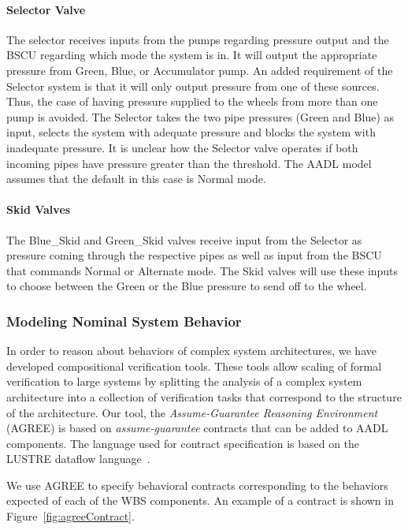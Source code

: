 \paragraph{Selector Valve}
The selector receives inputs from the pumps regarding pressure output and the BSCU regarding which mode the system is in. It will output the appropriate pressure from Green, Blue, or Accumulator pump. An added requirement of the Selector system is that it will only output pressure from one of these sources. Thus, the case of having pressure supplied to the wheels from more than one pump is avoided. The Selector takes the two pipe pressures (Green and Blue) as input, selects the system with adequate pressure and blocks the system with inadequate pressure. It is unclear how the Selector valve operates if both incoming pipes have pressure greater than the threshold. The AADL model assumes that the default in this case is Normal mode.

\paragraph{Skid Valves}
The Blue\_Skid and Green\_Skid valves receive input from the Selector as pressure coming through the respective pipes as well as input from the BSCU that commands Normal or Alternate mode. The Skid valves will use these inputs to choose between the Green or the Blue pressure to send off to the wheel.

\subsubsection{Modeling Nominal System Behavior}
In order to reason about behaviors of complex system architectures, we have developed compositional verification tools.  These tools \cite{NFM2012:CoGaMiWhLaLu} allow scaling of formal verification to large systems by splitting the analysis of a complex system architecture into a collection of verification tasks that correspond to the structure of the architecture.
Our tool, the {\em Assume-Guarantee Reasoning Environment} (AGREE) is based on {\em assume-guarantee} contracts that can be added to AADL components.  The language used for contract specification is based on the LUSTRE dataflow language~\cite{Halbwachs91:IEEE}.

We use AGREE to specify behavioral contracts corresponding to the behaviors expected of each of the WBS components. An example of a contract is shown in Figure~\ref{fig:agreeContract}.
%


